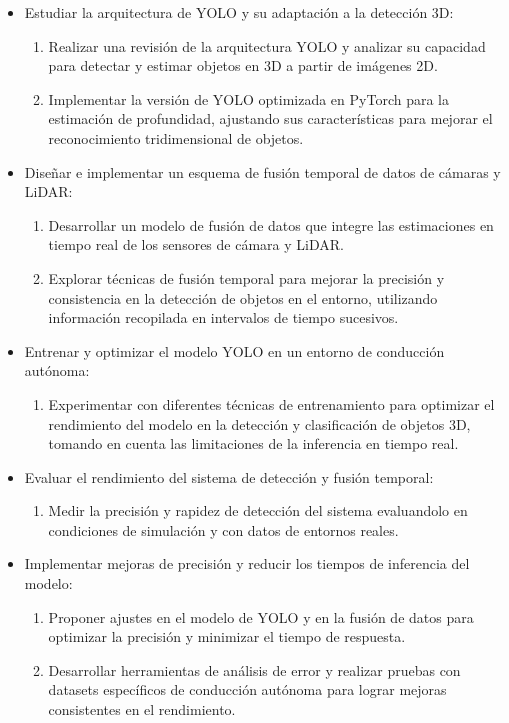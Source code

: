 \begin{itemize}
	\item Estudiar la arquitectura de YOLO y su adaptación a la detección 3D:
	\begin{enumerate}
		\item Realizar una revisión de la arquitectura YOLO y analizar su capacidad para detectar y estimar objetos en 3D a partir de imágenes 2D.
		\item Implementar la versión de YOLO optimizada en PyTorch para la estimación de profundidad, ajustando sus características para mejorar el reconocimiento tridimensional de objetos.
	\end{enumerate}
	
	\item Diseñar e implementar un esquema de fusión temporal de datos de cámaras y LiDAR:
	\begin{enumerate}
		\item Desarrollar un modelo de fusión de datos que integre las estimaciones en tiempo real de los sensores de cámara y LiDAR.
		\item Explorar técnicas de fusión temporal para mejorar la precisión y consistencia en la detección de objetos en el entorno, utilizando información recopilada en intervalos de tiempo sucesivos.
	\end{enumerate}
	
	\item Entrenar y optimizar el modelo YOLO en un entorno de conducción autónoma:
	\begin{enumerate}
		\item Experimentar con diferentes técnicas de entrenamiento para optimizar el rendimiento del modelo en la detección y clasificación de objetos 3D, tomando en cuenta las limitaciones de la inferencia en tiempo real.
	\end{enumerate}
	
	\item Evaluar el rendimiento del sistema de detección y fusión temporal:
	\begin{enumerate}
		\item Medir la precisión y rapidez de detección del sistema evaluandolo en condiciones de simulación y con datos de entornos reales.
	\end{enumerate}
	
	\item Implementar mejoras de precisión y reducir los tiempos de inferencia del modelo:
	\begin{enumerate}
		\item Proponer ajustes en el modelo de YOLO y en la fusión de datos para optimizar la precisión y minimizar el tiempo de respuesta.
		\item Desarrollar herramientas de análisis de error y realizar pruebas con datasets específicos de conducción autónoma para lograr mejoras consistentes en el rendimiento.
	\end{enumerate}
\end{itemize}

